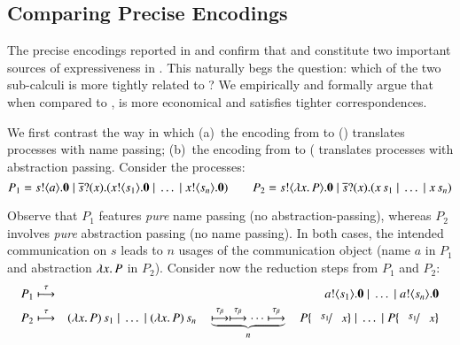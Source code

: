 
\subsection{Comparing Precise Encodings}\label{ss:compare}
The precise encodings reported in   and 
confirm that \HO and \sessp constitute two important sources of expressiveness in \HOp.
This naturally begs the question: which of the two sub-calculi is more tightly related to \HOp?
We empirically and formally argue that when compared to \sessp, \HO   is more economical and satisfies tighter correspondences.

We first contrast the way in which 
(a)~the encoding from \HOp to \HO () translates processes with name passing;
(b)~the encoding from \HOp to \sessp ( translates processes with abstraction passing.
Consider the \HOp processes:
$$
P_1  =  s ! \langle a \rangle . \mathbf{0} \;|\; \overline{s} ? (x) . (x ! \langle s_1 \rangle . \mathbf{0} \;|\; \dots \;|\; x ! \langle s_n \rangle . \mathbf{0}) \qquad
P_2  =  s ! \langle \lambda x.\,P \rangle . \mathbf{0} \;|\; \overline{s} ? (x) . (x\, {s_1} \;|\; \dots \;|\; x\, {s_n})
$$

\noi Observe that $P_1$ features \emph{pure} name passing (no abstraction-passing), whereas 
$P_2$ involves \emph{pure} abstraction passing (no name passing). In both cases, 
the intended communication on $s$ leads to $n$ usages of the communication object (name $a$ in $P_1$ and abstraction $\lambda x.\,P$ in $P_2$).
Consider now the reduction steps from $P_1$ and $P_2$:
\begin{eqnarray*}
P_1 & \hby{\tau} & \bout{a}{s_1} \inact \Par \dots \Par \bout{a}{s_n} \inact \\
P_2 & \hby{\tau}& \appl{(\abs{x}{P})}{s_1} \Par \dots \Par \appl{(\abs{x}{P})}{s_n} \quad 
\underbrace{\hby{\btau}\hby{\btau} \cdots \hby{\btau}}_{n} 
\quad P \subst{s_1}{x} \Par \dots \Par P \subst{s_1}{x} 
\end{eqnarray*}

